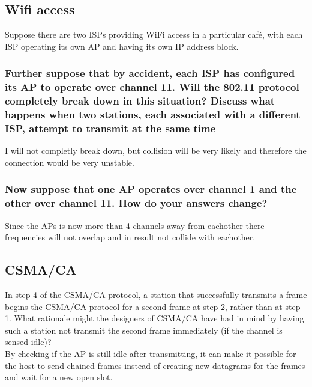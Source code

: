 \documentclass[12pt, a4paper]{article}
\begin{document}
		\subsection{Wifi access}
			Suppose there are two ISPs providing WiFi access in a particular café, with each ISP operating its own AP and having its own IP address block.
			\subsubsection{Further suppose that by accident, each ISP has configured its AP to operate over channel 11. Will the 802.11 protocol completely break down in this situation? Discuss what happens when two stations, each associated with a different ISP, attempt to transmit at the same time}
				I will not completly break down, but collision will be very likely and therefore the connection would be very unstable.
			\subsubsection{Now suppose that one AP operates over channel 1 and the other over channel 11. How do your answers change?}
				Since the APs is now more than 4 channels away from eachother there frequencies will not overlap and in result not collide with eachother.
		\subsection{CSMA/CA}
			In step 4 of the CSMA/CA protocol, a station that successfully transmits a frame begins the CSMA/CA protocol for a second frame at step 2, rather than at step 1. What rationale might the designers of CSMA/CA have had in mind by having such a station not transmit the second frame immediately (if the channel is sensed idle)?\\
			By checking if the AP is still idle after transmitting, it can make it possible for the host to send chained frames instead of creating new datagrams for the frames and wait for a new open slot.
\end{document}
